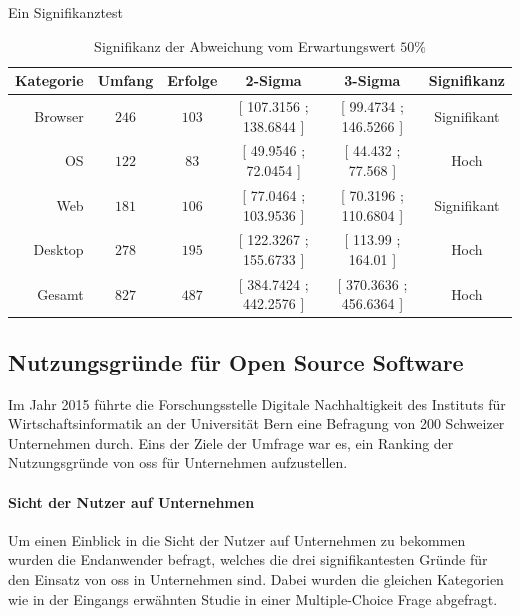 \documentclass[a4paper]{article}
\begin{document}
                Ein Signifikanztest 

                \begin{table}
                    \centering
                    \begin{tabular}{rccccc}
                        Kategorie & Umfang & Erfolge & 2-Sigma & 3-Sigma & Signifikanz \\\hline\hline
                        Browser & $246$ & $103$ & \tiny{[ 107.3156 ; 138.6844 ]} & \tiny{[ 99.4734 ; 146.5266 ]} & Signifikant\\
                        OS & $122$ & $83$ & \tiny{[ 49.9546 ; 72.0454 ]} &  \tiny{[ 44.432 ; 77.568 ]} & Hoch\\
                        Web & $181$ & $106$ & \tiny{[ 77.0464 ; 103.9536 ]} &  \tiny{[ 70.3196 ; 110.6804 ]} &  Signifikant\\
                        Desktop & $278$ & $195$ & \tiny{[ 122.3267 ; 155.6733 ]} & \tiny{[ 113.99 ; 164.01 ]} & Hoch\\\hline
                        Gesamt & $827$ & $487$ & \tiny{[ 384.7424 ; 442.2576 ]} & \tiny{[ 370.3636 ; 456.6364 ]} & Hoch
                    \end{tabular}
                    \caption{Signifikanz der Abweichung vom Erwartungswert $50\%$}
                    \label{table:knowledge_by_category_sigma}
                \end{table}
            
        \subsection{Nutzungsgründe für Open Source Software}
            Im Jahr 2015 führte die Forschungsstelle Digitale Nachhaltigkeit des Instituts für Wirtschaftsinformatik an der Universität Bern eine Befragung von 200 Schweizer Unternehmen durch\cite{oss:studie}. Eins der Ziele der Umfrage war es, ein Ranking der Nutzungsgründe von \gls{oss} für Unternehmen aufzustellen.

            \paragraph{Sicht der Nutzer auf Unternehmen}
                Um einen Einblick in die Sicht der Nutzer auf Unternehmen zu bekommen wurden die Endanwender befragt, welches die drei signifikantesten Gründe für den Einsatz von \gls{oss} in Unternehmen sind. Dabei wurden die gleichen Kategorien wie in der Eingangs erwähnten Studie in einer Multiple-Choice Frage abgefragt.
\end{document}
